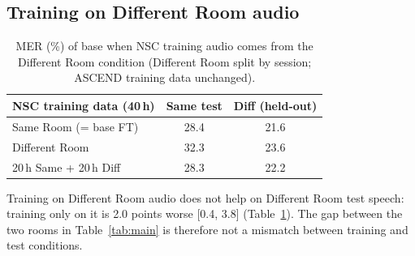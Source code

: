 \subsection{Training on Different Room audio}\label{app:diffroom}
\begin{table}[h]
\centering
\small
\setlength{\tabcolsep}{3pt}
\begin{tabular}{lcc}
\toprule
NSC training data (40\,h) & Same test & Diff (held-out) \\
\midrule
Same Room (= base FT) & 28.4 & 21.6 \\
Different Room & 32.3 & 23.6 \\
20\,h Same + 20\,h Diff & 28.3 & 22.2 \\
\bottomrule
\end{tabular}
\caption{MER (\%) of base when NSC training audio comes from the Different Room condition (Different Room split by session; ASCEND training data unchanged).}
\label{tab:diffroom}
\end{table}
Training on Different Room audio does not help on Different Room test speech: training only on it is 2.0 points worse [0.4, 3.8] (Table~\ref{tab:diffroom}). The gap between the two rooms in Table~\ref{tab:main} is therefore not a mismatch between training and test conditions.

